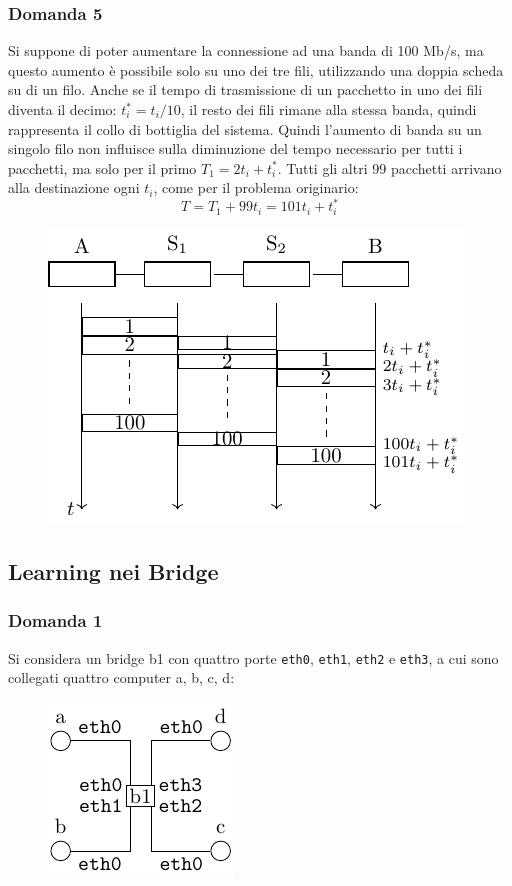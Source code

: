 \documentclass{article}
\numberwithin{equation}{subsection}
\begin{document}
\subsubsection*{Domanda 5}

Si suppone di poter aumentare la connessione ad una banda di 100 Mb/s, ma questo aumento è possibile solo su uno dei tre fili, utilizzando 
una doppia scheda su di un filo. Anche se il tempo di trasmissione di un pacchetto in uno dei fili diventa il decimo: $t^*_i=t_i/10$, il 
resto dei fili rimane alla stessa banda, quindi rappresenta il collo di bottiglia del sistema. Quindi l'aumento di banda su un singolo filo non influisce sulla 
diminuzione del tempo necessario per tutti i pacchetti, ma solo per il primo $T_1=2t_i+t_i^*$. Tutti gli altri 99 pacchetti arrivano alla destinazione ogni $t_i$, come per il 
problema originario:
\begin{equation}
    T=T_1+99t_i=101t_i+t_i^*
\end{equation}

\begin{figure}[H]%
    \centering%
    \includegraphics{effetto_store_forward_domanda_5.pdf}%
\end{figure}

\subsection{Learning nei Bridge}

\subsubsection*{Domanda 1}

Si considera un bridge b1 con quattro porte \verb|eth0|, \verb|eth1|, \verb|eth2| e \verb|eth3|, a cui sono collegati quattro computer a, b, c, d:
\begin{figure}[H]%
    \centering%
    \includegraphics{singolo_bridge.pdf}%
\end{figure}
\end{document}
